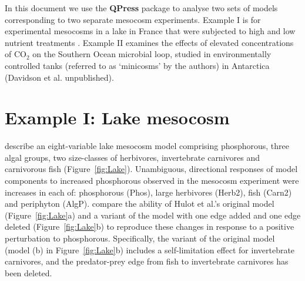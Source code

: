 \documentclass[a4paper]{article}\usepackage[]{graphicx}\usepackage[]{color}
\begin{document}
In this document we use the \textbf{QPress} package to analyse two sets of
models corresponding to two separate mesocosm experiments. Example I is for
experimental mesocosms in a lake in France that were subjected to high and low
nutrient treatments \citep{Hulot2000}. Example II examines the effects of
elevated concentrations of $\mathrm{CO}_2$ on the Southern Ocean microbial loop,
studied in environmentally controlled tanks (referred to as `minicosms' by the
authors) in Antarctica (Davidson et al. unpublished).

\section{Example I: Lake mesocosm}
\cite{Hulot2000} describe an eight-variable lake mesocosm model comprising
phosphorous, three algal groups, two size-classes of herbivores, invertebrate
carnivores and carnivorous fish (Figure~\ref{fig:Lake}). Unambiguous,
directional responses of model components to increased phosphorous observed in the
mesocosm experiment were increases in each of: phosphorous (Phos), large herbivores
(Herb2), fish (Carn2) and periphyton (AlgP). \cite{JMT2012} compare the ability
of Hulot et al.'s original model (Figure~\ref{fig:Lake}a) and a variant of the
model with one edge added and one edge deleted (Figure~\ref{fig:Lake}b) to
reproduce these changes in response to a positive perturbation to phosphorous.
Specifically, the variant of the original model (model (b) in
Figure~\ref{fig:Lake}b) includes a self-limitation effect for invertebrate
carnivores, and the predator-prey edge from fish to invertebrate carnivores has
been deleted.
\vspace{1cm}
\end{document}

